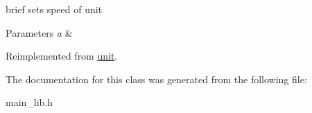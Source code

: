 brief sets speed of unit 
\begin{DoxyParams}{Parameters}
{\em a} & \\
\hline
\end{DoxyParams}


Reimplemented from \mbox{\hyperlink{classunit_a3b2dbfe9c1daaf2b8ef6b604d7803dc2}{unit}}.



The documentation for this class was generated from the following file\+:\begin{DoxyCompactItemize}
\item 
main\+\_\+lib.\+h\end{DoxyCompactItemize}
